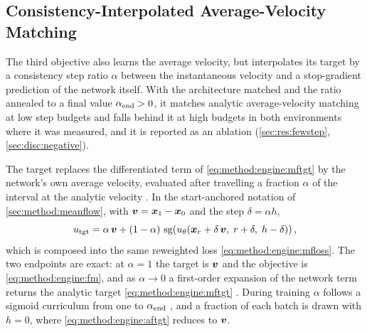 \subsection{Consistency-Interpolated Average-Velocity Matching}\label{sec:method:alphaflow}

The third objective \parencite{zhang2025alphaflow} also learns the average velocity, but interpolates
its target by a consistency step ratio $\alpha$ between the instantaneous velocity and a stop-gradient
prediction of the network itself. With the architecture matched and the ratio annealed to a final value
$\alpha_{\textrm{end}}>0$, it matches analytic average-velocity matching at low step budgets and
falls behind it at high budgets in both environments where it was measured, and it is reported as an
ablation (\autoref{sec:res:fewstep}, \autoref{sec:disc:negative}).

The target replaces the differentiated term of \eqref{eq:method:engine:mftgt} by the network's own
average velocity, evaluated after travelling a fraction $\alpha$ of the interval at the analytic
velocity \parencite[Def.~1, Alg.~1]{zhang2025alphaflow}. In the start-anchored notation of
\autoref{sec:method:meanflow}, with $\boldsymbol{v} = \boldsymbol{x}_{1}-\boldsymbol{x}_{0}$ and the step
$\delta = \alpha h$,
\begin{equation}\label{eq:method:engine:aftgt}
  u_{\textrm{tgt}}
  = \alpha\,\boldsymbol{v}
  + (1-\alpha)\,\operatorname{sg}\!\left(u_{\theta}\!\left(\boldsymbol{x}_{r}+\delta\,\boldsymbol{v},\;r+\delta,\;h-\delta\right)\right),
\end{equation}
which is composed into the same reweighted loss \eqref{eq:method:engine:mfloss}. The two endpoints are
exact: at $\alpha = 1$ the target is $\boldsymbol{v}$ and the objective is \eqref{eq:method:engine:fm}, and as
$\alpha \to 0$ a first-order expansion of the network term returns the analytic target
\eqref{eq:method:engine:mftgt} \parencite[Thm.~1]{zhang2025alphaflow}. During training $\alpha$ follows
a sigmoid curriculum from one to $\alpha_{\textrm{end}}$
\parencite[Alg.~2]{zhang2025alphaflow}, and a fraction of each batch is drawn with $h = 0$, where
\eqref{eq:method:engine:aftgt} reduces to $\boldsymbol{v}$.

